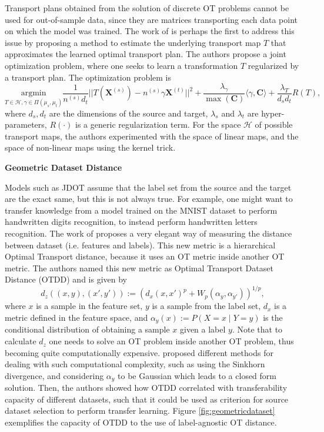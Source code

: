 Transport plans obtained from the solution of discrete OT problems cannot be used for out-of-sample
data, since they are matrices transporting each data point on which the model was trained. The work
of \citet{perrot2016mapping} is perhaps the first to address this issue by proposing a method
to estimate the underlying transport map $T$ that approximates the learned optimal transport plan.
The authors propose a joint optimization problem, where one seeks to
learn a transformation $T$ regularized by a transport plan. The optimization problem is
\begin{equation}
  \underset{T \in \mathcal H, \gamma \in \Pi(\mu_s,\mu_t)}{\mathrm{argmin}}
  \frac{1}{n^{(s)} d_t} ||T(\mathbf X^{(s)}) - n^{(s)} \gamma \mathbf X^{(t)}||^2 +
  \frac{\lambda_\gamma}{\max(\mathbf C)}\langle \gamma, \mathbf C\rangle +
  \frac{\lambda_T}{d_s d_t} R(T),
\end{equation}
where $d_s, d_t$ are the dimensions of the source and target, $\lambda_s$ and $\lambda_t$ are hyper-parameters,
$R(\cdot)$ is a generic regularization term.
For the space $\mathcal H$ of possible transport maps, the authors experimented with the space of linear maps,
and the space of non-linear maps using the kernel trick.

\vspace{5mm}
\noindent \textbf{Geometric Dataset Distance}
\vspace{3mm}

Models such as JDOT assume that the label set from the source and the target are the exact same, but this
is not always true. For example, one might want to transfer knowledge from a model trained on the MNIST
dataset to perform handwritten digits recognition, to instead perform handwritten letters recognition.
The work of \citet{alvarez2020geometric} proposes a very elegant way of measuring the distance between
dataset (i.e. features and labels). This new metric is a hierarchical Optimal Transport distance,
because it uses an OT metric inside another OT metric. The authors named this new metric as Optimal
Transport Dataset Distance (OTDD) and is given by
\begin{equation}
  d_z((x,y),(x',y')):= (d_x(x,x')^p + W_p(\alpha_y,\alpha_{y'}))^{1/p},
\end{equation}
where $x$ is a sample in the feature set, $y$ is a sample from the label set, $d_x$ is a metric defined
in the feature space, and $\alpha_y(x) := P(X = x \mid Y = y)$ is the conditional distribution of
obtaining a sample $x$ given a label $y$. Note that to calculate $d_z$ one needs to solve an OT problem
inside another OT problem, thus becoming quite computationally expensive. \citet{alvarez2020geometric}
proposed different methods for dealing with such computational complexity, such as using the
Sinkhorn divergence, and considering $\alpha_y$ to be Gaussian which leads to a closed form solution.
Then, the authors showed how OTDD correlated with transferability capacity of different datasets,
such that it could be used as criterion for source dataset selection to perform transfer learning.
Figure \ref{fig:geometricdataset} exemplifies the capacity of OTDD to the use of label-agnostic OT distance.

